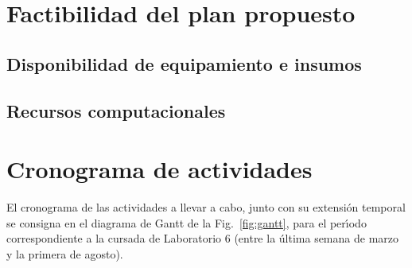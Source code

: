 \documentclass[fleqn,10pt]{SelfArx} %
\begin{document}
\section{Factibilidad del plan propuesto}

\subsection{Disponibilidad de equipamiento e insumos}

\subsection{Recursos computacionales}

\section{Cronograma de actividades}

El cronograma de las actividades a llevar a cabo, junto con su extensi\'on temporal se consigna en el diagrama de Gantt de la Fig.~\ref{fig:gantt}, para el per\'\i odo correspondiente a la cursada de Laboratorio 6 (entre la \'ultima semana de marzo y la primera de agosto). 

\begin{figure*}[ht!]
\centering
{}
\caption{Diagrama de Gantt para las actividades propuestas por el presente plan de trabajo.}
\label{fig:gantt}
\end{figure*}
\end{document}
